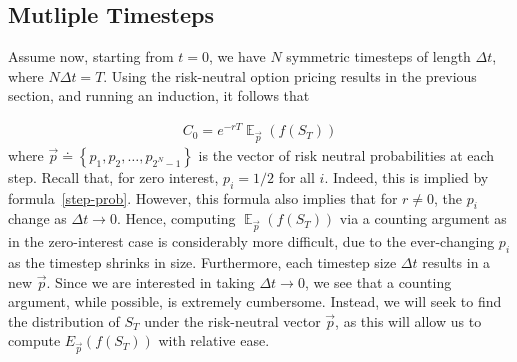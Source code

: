 \documentclass[12pt]{article}
\DeclareMathOperator{\ex}{\mathbb{E}}
\theoremstyle{plain}
\theoremstyle{definition}
\theoremstyle{remark}
\numberwithin{equation}{section}  %
\begin{document}
\subsection{Mutliple Timesteps}
Assume now, starting from $t=0$,
we have $N$ symmetric timesteps of length $\Delta t$, where
$N \Delta t  = T$. Using the risk-neutral option pricing
results in the previous section, and running an induction,
it follows that 

\begin{equation*}
\begin{split}
	C_{0} = e^{-rT} \ex_{\vec{p}}(f(S_{T}))
\end{split}
\end{equation*}
where $\vec{p} \doteq \left\{ p_{1}, p_{2}, \ldots, p_{2^{N} -1} \right\}$
is the vector of risk neutral probabilities at each step.
Recall that, for zero interest, 
$p_{i} = 1/2$ for all $i$. Indeed, this is implied by
formula~\eqref{step-prob}. However, this formula also implies that
for $r \neq 0$, the $p_i$ change as $\Delta t \to 0$. 
Hence, computing $\ex_{\vec{p}}(f(S_{T}))$ via a counting argument as
in the zero-interest case is considerably more difficult, due to the
ever-changing $p_i$ as the timestep shrinks in size. Furthermore,
each timestep size $\Delta t$ results in a new $\vec{p}$.
Since we are interested in taking $\Delta t \to 0$, we see that a counting
argument, while possible, is extremely cumbersome.
Instead, we will seek to find the distribution of $S_{T}$ under
the risk-neutral vector $\vec{p}$, as this will allow us to compute
$E_{\vec{p}} (f(S_{T}))$ with relative ease. 
\end{document}

